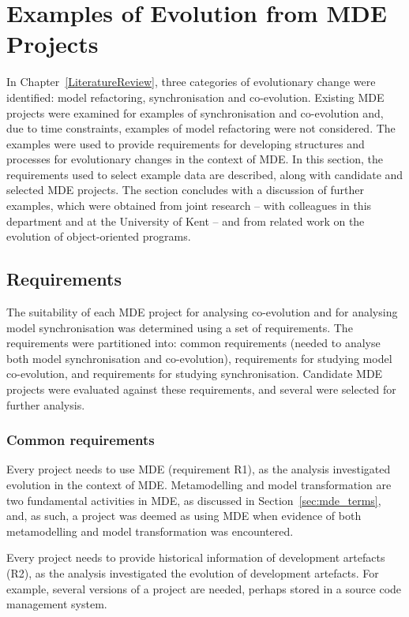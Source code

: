 \section{Examples of Evolution from MDE Projects}
\label{sec:locating_data}
In Chapter~\ref{LiteratureReview}, three categories of evolutionary change were identified: model refactoring, synchronisation and co-evolution. Existing MDE projects were examined for examples of synchronisation and co-evolution and, due to time constraints, examples of model refactoring were not considered. The examples were used to provide requirements for developing structures and processes for evolutionary changes in the context of MDE. In this section, the requirements used to select example data are described, along with candidate and selected MDE projects. The section concludes with a discussion of further examples, which were obtained from joint research -- with colleagues in this department and at the University of Kent -- and from related work on the evolution of object-oriented programs.  

\subsection{Requirements}
The suitability of each MDE project for analysing co-evolution and for an\-al\-ys\-i\-ng model synchronisation was determined using a set of requirements. The requirements were partitioned into: common requirements (needed to analyse both model synchronisation and co-evolution), requirements for studying model co-evolution, and requirements for studying synchronisation. Candidate MDE projects were evaluated against these requirements, and several were selected for further analysis.

\subsubsection{Common requirements}
Every project needs to use MDE (requirement R1), as the analysis investigated evolution in the context of MDE. Metamodelling and model transformation are two fundamental activities in MDE, as discussed in Section~\ref{sec:mde_terms}, and, as such, a project was deemed as using MDE when evidence of both metamodelling and model transformation was encountered.

Every project needs to provide historical information of development artefacts (R2), as the analysis investigated the evolution of development artefacts. For example, several versions of a project are needed, perhaps stored in a source code management system.

